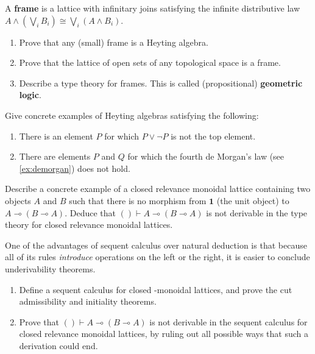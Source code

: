 \documentclass{book}
\let\types\vdash
\let\meet\wedge
\let\join\vee
\let\bigjoin\bigvee
\def\one{\mathbf{1}}
\let\hom\multimap
\begin{document}
\begin{ex}\label{ex:frames}
  A \textbf{frame} is a lattice with infinitary joins satisfying the infinite distributive law $A \meet \left(\bigjoin_i B_i\right) \cong \bigjoin_i (A\meet B_i)$.
  \begin{enumerate}
  \item Prove that any (small) frame is a Heyting algebra.
  \item Prove that the lattice of open sets of any topological space is a frame.
  \item Describe a type theory for frames.  This is called (propositional) \textbf{geometric logic}.
  \end{enumerate}
\end{ex}

\begin{ex}\label{ex:not-lem}
  Give concrete examples of Heyting algebras satisfying the following:
  \begin{enumerate}
  \item There is an element $P$ for which $P\join \neg P$ is not the top element.
  \item There are elements $P$ and $Q$ for which the fourth de Morgan's law (see \cref{ex:demorgan}) does not hold.
  \end{enumerate}
\end{ex}

\begin{ex}\label{ex:relevance-eg}
  Describe a concrete example of a closed relevance monoidal lattice containing two objects $A$ and $B$ such that there is no morphism from $\one$ (the unit object) to $A\hom (B\hom A)$.
  Deduce that $()\types A\hom (B\hom A)$ is not derivable in the type theory for closed relevance monoidal lattices.
\end{ex}

\begin{ex}\label{ex:seqcalc-logic}
  One of the advantages of sequent calculus over natural deduction is that because all of its rules \emph{introduce} operations on the left or the right, it is easier to conclude underivability theorems.
  \begin{enumerate}
  \item Define a sequent calculus for closed \fS-monoidal lattices, and prove the cut admissibility and initiality theorems.
  \item Prove that $()\types A\hom (B\hom A)$ is not derivable in the sequent calculus for closed relevance monoidal lattices, by ruling out all possible ways that such a derivation could end.
  \end{enumerate}
\end{ex}
\end{document}
